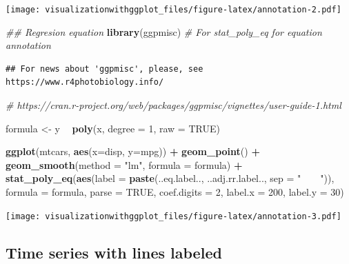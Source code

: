 \documentclass[]{krantz}
\makeatletter
\newenvironment{Shaded}{\begin{snugshade}}{\end{snugshade}}
\newcommand{\CommentTok}[1]{\textcolor[rgb]{0.56,0.35,0.01}{\textit{#1}}}
\newcommand{\DataTypeTok}[1]{\textcolor[rgb]{0.13,0.29,0.53}{#1}}
\newcommand{\DecValTok}[1]{\textcolor[rgb]{0.00,0.00,0.81}{#1}}
\newcommand{\KeywordTok}[1]{\textcolor[rgb]{0.13,0.29,0.53}{\textbf{#1}}}
\newcommand{\NormalTok}[1]{#1}
\newcommand{\OperatorTok}[1]{\textcolor[rgb]{0.81,0.36,0.00}{\textbf{#1}}}
\newcommand{\OtherTok}[1]{\textcolor[rgb]{0.56,0.35,0.01}{#1}}
\newcommand{\StringTok}[1]{\textcolor[rgb]{0.31,0.60,0.02}{#1}}
\newenvironment{kframe}{%
\medskip{}
\setlength{\fboxsep}{.8em}
 \def\at@end@of@kframe{}%
 \ifinner\ifhmode%
  \def\at@end@of@kframe{\end{minipage}}%
  \begin{minipage}{\columnwidth}%
 \fi\fi%
 \def\FrameCommand##1{\hskip\@totalleftmargin \hskip-\fboxsep
 \colorbox{shadecolor}{##1}\hskip-\fboxsep
     \hskip-\linewidth \hskip-\@totalleftmargin \hskip\columnwidth}%
 \MakeFramed {\advance\hsize-\width
   \@totalleftmargin\z@ \linewidth\hsize
   \@setminipage}}%
 {\par\unskip\endMakeFramed%
 \at@end@of@kframe}
\renewenvironment{Shaded}{\begin{kframe}}{\end{kframe}}
\makeatother
\begin{document}
\texttt{[image: visualizationwithggplot\_files/figure-latex/annotation-2.pdf]}

\begin{Shaded}
\begin{Highlighting}[]
\CommentTok{## Regresion equation}
\KeywordTok{library}\NormalTok{(ggpmisc) }\CommentTok{# For stat_poly_eq for equation annotation  }
\end{Highlighting}
\end{Shaded}

\begin{verbatim}
## For news about 'ggpmisc', please, see https://www.r4photobiology.info/
\end{verbatim}

\begin{Shaded}
\begin{Highlighting}[]
\CommentTok{# https://cran.r-project.org/web/packages/ggpmisc/vignettes/user-guide-1.html}

\NormalTok{formula <-}\StringTok{ }\NormalTok{y }\OperatorTok{~}\StringTok{ }\KeywordTok{poly}\NormalTok{(x, }\DataTypeTok{degree =} \DecValTok{1}\NormalTok{, }\DataTypeTok{raw =} \OtherTok{TRUE}\NormalTok{)}

\KeywordTok{ggplot}\NormalTok{(mtcars, }\KeywordTok{aes}\NormalTok{(}\DataTypeTok{x=}\NormalTok{disp, }\DataTypeTok{y=}\NormalTok{mpg)) }\OperatorTok{+}\StringTok{ }
\StringTok{    }\KeywordTok{geom_point}\NormalTok{() }\OperatorTok{+}
\StringTok{  }\KeywordTok{geom_smooth}\NormalTok{(}\DataTypeTok{method =} \StringTok{"lm"}\NormalTok{, }\DataTypeTok{formula =}\NormalTok{ formula) }\OperatorTok{+}
\StringTok{  }\KeywordTok{stat_poly_eq}\NormalTok{(}\KeywordTok{aes}\NormalTok{(}\DataTypeTok{label =}  \KeywordTok{paste}\NormalTok{(..eq.label.., ..adj.rr.label.., }\DataTypeTok{sep =} \StringTok{"~~~~"}\NormalTok{)),}
                   \DataTypeTok{formula =}\NormalTok{ formula, }\DataTypeTok{parse =} \OtherTok{TRUE}\NormalTok{, }\DataTypeTok{coef.digits =} \DecValTok{2}\NormalTok{, }
                   \DataTypeTok{label.x =} \DecValTok{200}\NormalTok{, }\DataTypeTok{label.y =} \DecValTok{30}\NormalTok{)}
\end{Highlighting}
\end{Shaded}

\texttt{[image: visualizationwithggplot\_files/figure-latex/annotation-3.pdf]}

\hypertarget{time-series-with-lines-labeled}{%
\subsection{Time series with lines labeled}\label{time-series-with-lines-labeled}}
\end{document}
